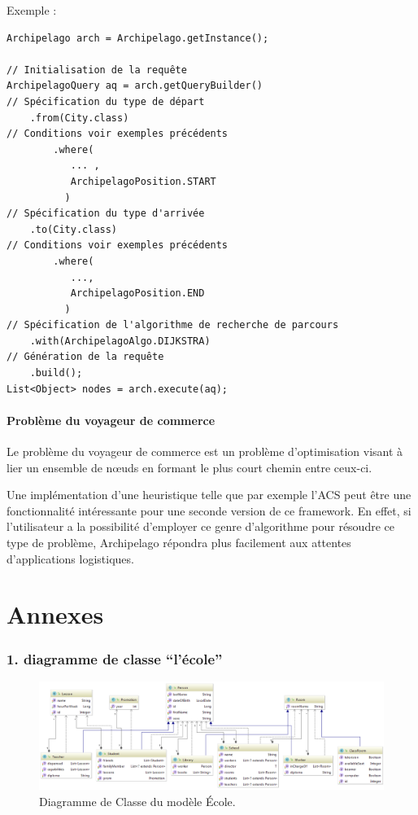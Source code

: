 \documentclass[a4paper,fleqn,12pt,oneside]{book}
\begin{document}
Exemple : 

\begin{lstlisting}
Archipelago arch = Archipelago.getInstance();

// Initialisation de la requête
ArchipelagoQuery aq = arch.getQueryBuilder()
// Spécification du type de départ
    .from(City.class)
// Conditions voir exemples précédents     
    	.where(
    	   ... ,
    	   ArchipelagoPosition.START
    	  )
// Spécification du type d'arrivée
    .to(City.class)
// Conditions voir exemples précédents  
    	.where(
    	   ...,
    	   ArchipelagoPosition.END
    	  )
// Spécification de l'algorithme de recherche de parcours
    .with(ArchipelagoAlgo.DIJKSTRA)
// Génération de la requête
    .build();
List<Object> nodes = arch.execute(aq);
\end{lstlisting}


\subsection*{Problème du voyageur de commerce}

Le problème du voyageur de commerce est un problème d'optimisation visant à lier un ensemble de nœuds en formant le plus court chemin entre ceux-ci.

Une implémentation d'une heuristique telle que par exemple l'ACS\cite{dorigo1997ant} peut être une fonctionnalité intéressante pour une seconde version de ce framework. En effet, si l'utilisateur a la possibilité d'employer ce genre d'algorithme pour résoudre ce type de problème, Archipelago répondra plus facilement aux attentes d'applications logistiques.



 

\part{Annexes}
\section*{1. diagramme de classe \enquote{l'école}}

\begin{figure}[!ht]
	\centering
    \includegraphics[angle=90,origin=c,scale=0.8]{figures/SchoolDiag.png}
    \caption{Diagramme de Classe du modèle École.}
    \label{fig:SchoolDiagram}
\end{figure}
\end{document}
